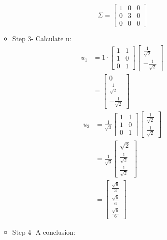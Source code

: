 \documentclass[11pt]{article} %
\begin{document}
\begin{enumerate}
\begin{itemize}
$$\Sigma =\begin{bmatrix}
	1&0&0\\
	0&3&0\\
	0&0&0
\end{bmatrix}$$
\item Step 3- Calculate u:
\begin{align*}
u_1&=1\cdot \begin{bmatrix}
	1&1\\1&0\\0&1
\end{bmatrix}\begin{bmatrix}
\frac{1}{\sqrt{2}}\\
-\frac{1}{\sqrt{2}}
\end{bmatrix}\\
&=\begin{bmatrix}
	0\\\frac{1}{\sqrt{2}}\\-\frac{1}{\sqrt{2}}
\end{bmatrix}
\end{align*}
\begin{align*}
	u_2&=\frac{1}{\sqrt{3}}\begin{bmatrix}
		1&1\\1&0\\0&1
	\end{bmatrix}\begin{bmatrix}
	\frac{1}{\sqrt{2}}\\\frac{1}{\sqrt{2}}
\end{bmatrix}\\
	&= \frac{1}{\sqrt{3}}\begin{bmatrix}
		\sqrt{2}\\\frac{1}{\sqrt{2}}\\\frac{1}{\sqrt{2}}
\end{bmatrix}\\
&=\begin{bmatrix}
	\frac{\sqrt{6}}{3}\\
	\frac{\sqrt{6}}{6}\\
	\frac{\sqrt{6}}{6}
\end{bmatrix}
\end{align*}


\item Step 4- A conclusion:


\end{itemize}
\end{enumerate}
\end{document}
